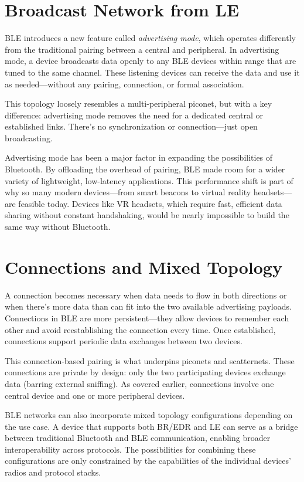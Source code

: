 \section{Broadcast Network from LE}

BLE introduces a new feature called \textit{advertising mode}, which operates differently from the traditional pairing between a central and peripheral. In advertising mode, a device broadcasts data openly to any BLE devices within range that are tuned to the same channel. These listening devices can receive the data and use it as needed—without any pairing, connection, or formal association.

This topology loosely resembles a multi-peripheral piconet, but with a key difference: advertising mode removes the need for a dedicated central or established links. There’s no synchronization or connection—just open broadcasting.

Advertising mode has been a major factor in expanding the possibilities of Bluetooth. By offloading the overhead of pairing, BLE made room for a wider variety of lightweight, low-latency applications. This performance shift is part of why so many modern devices—from smart beacons to virtual reality headsets—are feasible today. Devices like VR headsets, which require fast, efficient data sharing without constant handshaking, would be nearly impossible to build the same way without Bluetooth.

\section{Connections and Mixed Topology}

A connection becomes necessary when data needs to flow in both directions or when there’s more data than can fit into the two available advertising payloads. Connections in BLE are more persistent—they allow devices to remember each other and avoid reestablishing the connection every time. Once established, connections support periodic data exchanges between two devices.

This connection-based pairing is what underpins piconets and scatternets. These connections are private by design: only the two participating devices exchange data (barring external sniffing). As covered earlier, connections involve one central device and one or more peripheral devices.

BLE networks can also incorporate mixed topology configurations depending on the use case. A device that supports both BR/EDR and LE can serve as a bridge between traditional Bluetooth and BLE communication, enabling broader interoperability across protocols. The possibilities for combining these configurations are only constrained by the capabilities of the individual devices' radios and protocol stacks.

